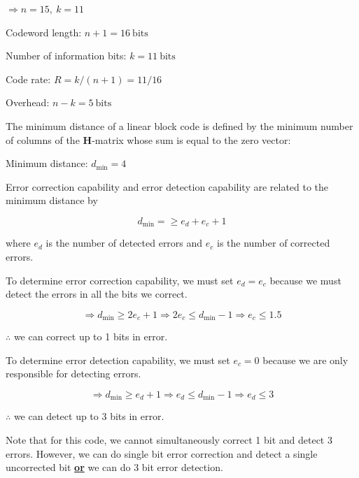 \documentclass[fleqn]{article}
\begin{document}
\begin{enumerate}
\begin{enumerate}
			$\Rightarrow n = 15,\ k = 11$
						
			Codeword length: $n + 1 = 16\ \text{bits}$
			
			Number of information bits: $k = 11\ \text{bits}$
			
			Code rate: $R = k/(n+1) = 11/16$
			
			Overhead: $n - k = 5\ \text{bits}$
			
			The minimum distance of a linear block code is defined by the minimum number of columns of the $\mathbf{H}$-matrix whose sum is equal to the zero vector:
			
			Minimum distance: $d_\text{min} = 4$
			
			Error correction capability and error detection capability are related to the minimum distance by
			
			\begin{equation*}
				d_{\text{min}} = \geq e_d + e_c + 1
			\end{equation*}
			
			where $e_d$ is the number of detected errors and $e_c$ is the number of corrected errors.
			
			To determine error correction capability, we must set $e_d = e_c$ because we must detect the errors in all the bits we correct.
			
			\begin{equation*}
				\Rightarrow d_{\text{min}} \geq 2e_c + 1 \Rightarrow 2e_c \leq d_{\text{min}} - 1 \Rightarrow e_c \leq 1.5
			\end{equation*}
			
			$\therefore$ we can correct up to 1 bits in error.
			
			To determine error detection capability, we must set $e_c = 0$ because we are only responsible for detecting errors.
			
			\begin{equation*}
				\Rightarrow d_{\text{min}} \geq e_d + 1 \Rightarrow e_d \leq d_{\text{min}} - 1 \Rightarrow e_d \leq 3
			\end{equation*}
			
			$\therefore$ we can detect up to 3 bits in error.
			
			Note that for this code, we cannot simultaneously correct 1 bit and detect 3 errors. However, we can do single bit error correction and detect a single uncorrected bit \textbf{\underline{or}} we can do 3 bit error detection.
		\end{enumerate}
		

\end{enumerate}
\end{document}
